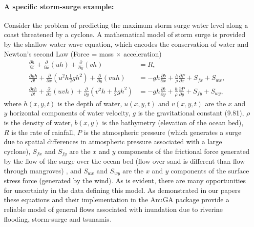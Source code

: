 \paragraph*{A specific storm-surge example:}
Consider the problem of predicting the maximum 
storm surge water level along a coast threatened by a cyclone. 
A mathematical model of storm surge is provided 
by the shallow water wave equation,  which encodes the conservation of water and Newton's second Law (Force = mass $\times$ acceleration) 
\begin{align*}
\frac{\partial h}{\partial t} +
\frac{\partial }{\partial x} \left(uh\right) + \frac{\partial }{\partial y} \left(vh\right) &= R, \\
\frac{\partial uh}{\partial t} +
\frac{\partial }{\partial x} \left(u^2h  \frac12 gh^2 \right) 
+ \frac{\partial }{\partial y} \left(vuh\right) &= - gh \frac{\partial b}{\partial x} 
+ \frac{h}{\rho} \frac{\partial P}{\partial  x} + S_{fx} + S_{wx} ,\\
\frac{\partial vh}{\partial t} +
\frac{\partial }{\partial x} \left(uvh  \right) 
+ \frac{\partial }{\partial y} \left(v^2h + \frac12 g h^2 \right) &=  - gh \frac{\partial b}{\partial y} 
+ \frac{h}{\rho} \frac{\partial P}{\partial  y} + S_{fy} + S_{wy},
\end{align*}
where $h(x,y,t)$ is the depth of water, $u(x,y,t)$ and $v(x,y,t)$ are the $x$ and $y$ horizontal components of water velocity, $g$ is the gravitational constant (9.81), $\rho$ is the density of water, $b(x,y)$ is the bathymetry (elevation of the ocean bed), $R$ is the rate of rainfall, $P$ is the atmospheric pressure (which generates a surge due to spatial differences in atmospheric pressure associated with a large cyclone), $S_{fx}$ and $S_{fy}$ are the $x$ and $y$ components of the frictional force generated by the flow of the surge over the ocean bed (flow over sand is different than flow through mangroves) , and $S_{wx}$ and $S_{wy}$ are the $x$ and $y$ components of the surface stress force (generated by the wind). As is evident, there are many opportunities for uncertainty in the data defining this model. 
As demonstrated in our papers~\parencite{anugamanual,nielsen2005hydrodynamic}  these
equations and their implementation in the AnuGA package provide a reliable
model of general flows associated with inundation due to riverine flooding, storm-surge 
and tsunamis.

